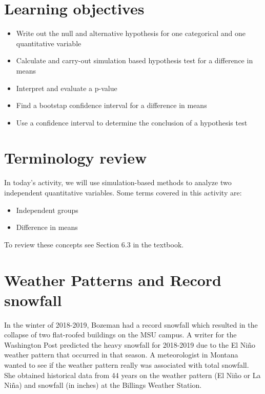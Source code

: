 \documentclass[
]{report}
\begin{document}
\hypertarget{learning-objectives}{%
\section{Learning objectives}\label{learning-objectives}}

\begin{itemize}
\item
  Write out the null and alternative hypothesis for one categorical and one quantitative variable
\item
  Calculate and carry-out simulation based hypothesis test for a difference in means
\item
  Interpret and evaluate a p-value
\item
  Find a bootstap confidence interval for a difference in means
\item
  Use a confidence interval to determine the conclusion of a hypothesis test
\end{itemize}

\hypertarget{terminology-review}{%
\section{Terminology review}\label{terminology-review}}

In today's activity, we will use simulation-based methods to analyze two independent quantitative variables. Some terms covered in this activity are:

\begin{itemize}
\item
  Independent groups
\item
  Difference in means
\end{itemize}

To review these concepts see Section 6.3 in the textbook.

\hypertarget{weather-patterns-and-record-snowfall-1}{%
\section{Weather Patterns and Record snowfall}\label{weather-patterns-and-record-snowfall-1}}

In the winter of 2018-2019, Bozeman had a record snowfall which resulted in the collapse of two flat-roofed buildings on the MSU campus. A writer for the Washington Post predicted the heavy snowfall for 2018-2019 due to the El Ni\~{n}o weather pattern that occurred in that season. A meteorologist in Montana wanted to see if the weather pattern really was associated with total snowfall. She obtained historical data from 44 years on the weather pattern (El Ni\~{n}o or La Ni\~{n}a) and snowfall (in inches) at the Billings Weather Station.
\end{document}
